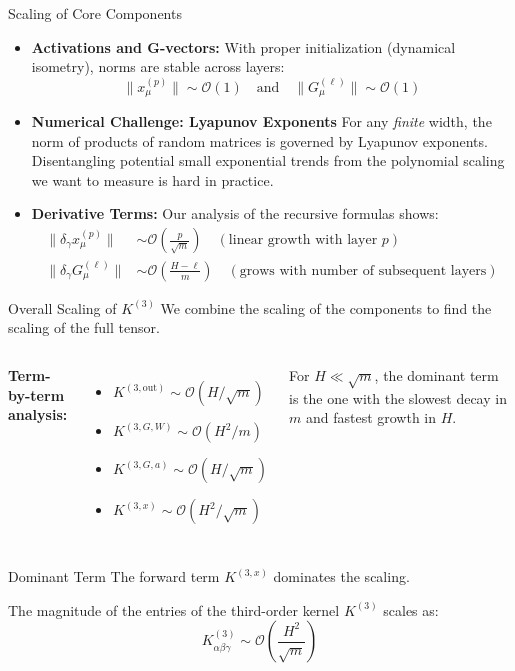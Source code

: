 \documentclass{beamer}
\newcommand{\Order}{\mathcal{O}}
\begin{document}
\begin{frame}{Scaling of Core Components}
\begin{itemize}
    \item \textbf{Activations and G-vectors:}
    With proper initialization (dynamical isometry), norms are stable across layers:
    \[ \|x^{(p)}_\mu\| \sim \Order(1) \quad \text{and} \quad \|G^{(\ell)}_\mu\| \sim \Order(1) \]
    
    \item \textbf{Numerical Challenge: Lyapunov Exponents}
    For any \textit{finite} width, the norm of products of random matrices is governed by Lyapunov exponents. Disentangling potential small exponential trends from the polynomial scaling we want to measure is hard in practice.
    
    \item \textbf{Derivative Terms:}
    Our analysis of the recursive formulas shows:
    \begin{align*}
    \|\delta_\gamma x^{(p)}_\mu\| &\sim \Order\left(\frac{p}{\sqrt{m}}\right) \quad (\text{linear growth with layer } p) \\
    \|\delta_\gamma G^{(\ell)}_\mu\| &\sim \Order\left(\frac{H-\ell}{m}\right) \quad (\text{grows with number of subsequent layers})
    \end{align*}
\end{itemize}
\end{frame}

\begin{frame}{Overall Scaling of $K^{(3)}$}
We combine the scaling of the components to find the scaling of the full tensor.

\begin{columns}
\textbf{Term-by-term analysis:}
\begin{itemize}
    \item $K^{(3, \text{out})} \sim \Order(H/\sqrt{m})$
    \item $K^{(3, G, W)} \sim \Order(H^2/m)$
    \item $K^{(3, G, a)} \sim \Order(H/\sqrt{m})$
    \item $K^{(3, x)} \sim \Order(H^2/\sqrt{m})$
\end{itemize}
For $H \ll \sqrt{m}$, the dominant term is the one with the slowest decay in $m$ and fastest growth in $H$.
\end{columns}

\begin{alertblock}{Dominant Term}
The forward term $K^{(3,x)}$ dominates the scaling.
\end{alertblock}

\begin{theorem}[Scaling of $K^{(3)}$]
The magnitude of the entries of the third-order kernel $K^{(3)}$ scales as:
\begin{equation*}
K^{(3)}_{\alpha\beta\gamma} \sim \Order\left(\frac{H^2}{\sqrt{m}}\right)
\end{equation*}
\end{theorem}
\end{frame}
\end{document}
